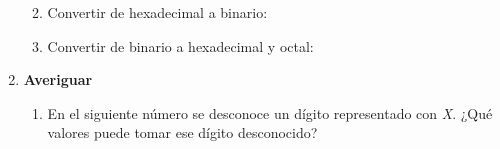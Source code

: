 \documentclass[12pt]{article}
\begin{document}
\begin{enumerate}
\begin{enumerate}

        \item Convertir de hexadecimal a binario:


        \item Convertir de binario a hexadecimal y octal:


    \end{enumerate}

    \item \textbf{Averiguar}

    \begin{enumerate}

        \item En el siguiente número se desconoce un dígito representado con
            \emph{X}. ¿Qué valores puede tomar ese dígito desconocido?


\end{enumerate}
\end{enumerate}
\end{document}
